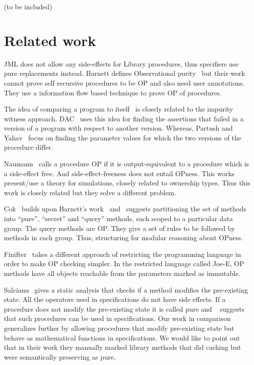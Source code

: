 \documentclass{llncs}
\begin{document}
(to be included)
\section{Related work}
JML does not allow any side-effects for Library procedures, thus
specifiers use pure replacements instead. Barnett defines
Observational purity~\cite{barnett200499} but their work cannot prove
self recursive procedures to be OP and also need user
annotations. They use a information flow based technique to prove OP
of procedures.

The idea of comparing a program to
itself~\cite{lahiri2013differential} \cite{partush2013abstract} is
closely related to the impurity witness
approach. DAC~\cite{lahiri2013differential} uses this idea for finding
the assertions that failed in a version of a program with respect to
another version. Whereas, Partush and Yahav~\cite{partush2013abstract}
focus on finding the parameter values for which the two versions of
the procedure differ.

Naumann~\cite{naumann2007observational} calls a procedure OP if it is
output-equivalent to a procedure which is a side-effect free. And
side-effect-freeness does not entail OPness. This works present/use a
theory for simulations, closely related to ownership types. Thus this
work is closely related but they solve a different problem.

Cok~\cite{cok2008extensions} builds upon Barnett's
work~\cite{barnett2006allowing} and~\cite{barnett200499} suggests
partitioning the set of methods into ``pure'', ``secret'' and
``query'' methods, each scoped to a particular data group. The query
methods are OP. They give a set of rules to be followed by methods in
each group. Thus, structuring for modular reasoning about OPness.

Finifter~\cite{cok2008extensions} takes a different approach of
restricting the programming language in order to make OP checking
simpler. In the restricted language called Joe-E, OP methods have all
objects reachable from the parameters marked as immutable.

Salcianu~\cite{sualcianu2005purity} gives a static analysis that
checks if a method modifies the pre-existing state. All the operators
used in specifications do not have side effects. If a procedure does
not modify the pre-existing state it is called pure and
~\cite{barnett200499} suggests that such procedures can be used in
specifications. Our work in comparison generalizes further by allowing
procedures that modify pre-existing state but behave as mathematical
functions in specifications. We would like to point out that in their
work they manually marked library methods that did caching but were
semantically preserving as pure.
\end{document}
